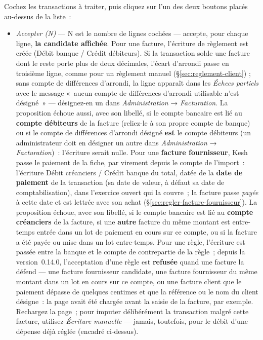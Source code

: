 \documentclass[a4paper,11pt,oneside]{article}
\begin{document}
Cochez les transactions à traiter, puis cliquez sur l'un des deux boutons placés au-dessus de la liste~:

\begin{itemize}
    \item \emph{Accepter (N)} --- N est le nombre de lignes cochées --- accepte, pour chaque ligne, \textbf{la candidate affichée}. Pour une facture, l'écriture de règlement est créée (Débit banque / Crédit débiteurs). Si la transaction solde une facture dont le reste porte plus de deux décimales, l'écart d'arrondi passe en troisième ligne, comme pour un règlement manuel (\S\ref{sec:reglement-client}) ; sans compte de différences d'arrondi, la ligne apparaît dans les \emph{Échecs partiels} avec le message «~aucun compte de différences d'arrondi utilisable n'est désigné~» --- désignez-en un dans \emph{Administration} → \emph{Facturation}. La proposition échoue aussi, avec son libellé, si le compte bancaire est lié au \textbf{compte débiteurs} de la facture (reliez-le à son propre compte de banque) ou si le compte de différences d'arrondi désigné \textbf{est} le compte débiteurs (un administrateur doit en désigner un autre dans \emph{Administration} → \emph{Facturation})~: l'écriture serait nulle. Pour une \textbf{facture fournisseur}, Kesh passe le paiement de la fiche, par virement depuis le compte de l'import~: l'écriture Débit créanciers / Crédit banque du total, datée de la \textbf{date de paiement} de la transaction (sa date de valeur, à défaut sa date de comptabilisation), dans l'exercice ouvert qui la couvre~; la facture passe \emph{payée} à cette date et est lettrée avec son achat (\S\ref{sec:regler-facture-fournisseur}). La proposition échoue, avec son libellé, si le compte bancaire est lié au \textbf{compte créanciers} de la facture, si une \textbf{autre} facture du même montant est entre-temps entrée dans un lot de paiement en cours sur ce compte, ou si la facture a été payée ou mise dans un lot entre-temps. Pour une règle, l'écriture est passée entre la banque et le compte de contrepartie de la règle~; depuis la version~0.14.0, l'acceptation d'une règle est \textbf{refusée} quand une facture la défend --- une facture fournisseur candidate, une facture fournisseur du même montant dans un lot en cours sur ce compte, ou une facture client que le paiement dépasse de quelques centimes et que la référence ou le nom du client désigne~: la page avait été chargée avant la saisie de la facture, par exemple. Rechargez la page~; pour imputer délibérément la transaction malgré cette facture, utilisez \emph{Écriture manuelle} --- jamais, toutefois, pour le débit d'une dépense déjà réglée (encadré ci-dessus).

\end{itemize}
\end{document}

